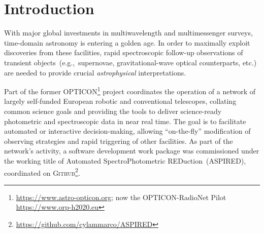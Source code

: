 \documentclass[linenumbers, twocolumn]{aastex631}
\begin{document}


\section{Introduction}
With major global investments in multiwavelength and multimessenger surveys,
time-domain astronomy is entering a golden age. In order to maximally exploit
discoveries from these facilities, rapid spectroscopic follow-up observations
of transient objects~(e.g.,\ supernovae, gravitational-wave optical counterparts,
etc.) are needed to provide crucial {\em astrophysical} interpretations. 

Part of
the former OPTICON\footnote{\url{https://www.astro-opticon.org}; now the
OPTICON-RadioNet Pilot \url{https://www.orp-h2020.eu}} project coordinates the
operation of a network of largely self-funded European robotic and conventional
telescopes, collating common science goals and providing the tools to deliver
science-ready photometric and spectroscopic data in near real time. The goal is
to facilitate automated or interactive decision-making, allowing ``on-the-fly''
modification of observing strategies and rapid triggering of other facilities.
As part of the network's activity, a software development work package was
commissioned under the working title of Automated SpectroPhotometric
REDuction~(\textsc{ASPIRED}), coordinated on
\textsc{Github}\footnote{\url{https://github.com/cylammarco/ASPIRED}}.
\end{document}
